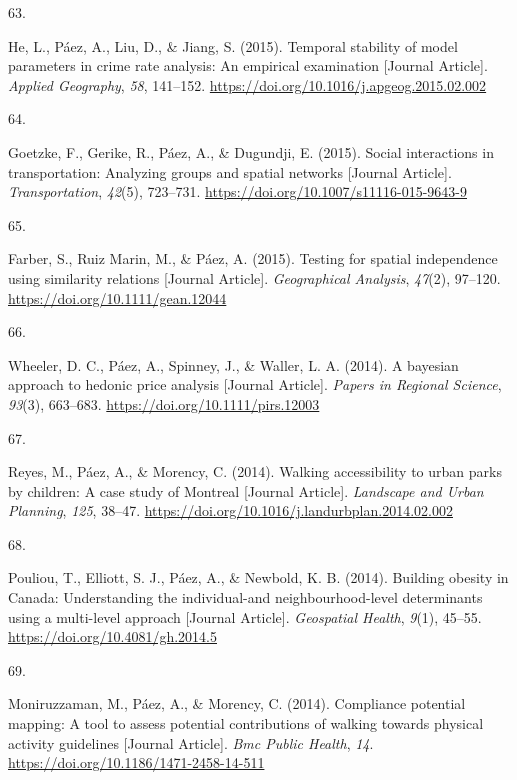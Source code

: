 \documentclass[11pt,a4paper,]{awesome-cv}
\newlength{\cslhangindent}
\newlength{\csllabelwidth}
\newenvironment{CSLReferences}[2] %
 {\begin{list}{}{%
  \setlength{\itemindent}{0pt}
  \setlength{\leftmargin}{0pt}
  \setlength{\parsep}{0pt}
  \ifodd #1
   \setlength{\leftmargin}{\cslhangindent}
   \setlength{\itemindent}{-1\cslhangindent}
  \fi
  \setlength{\itemsep}{#2\baselineskip}}}
 {\end{list}}
\newcommand{\CSLLeftMargin}[1]{\parbox[t]{\csllabelwidth}{\strut#1\strut}}
\newcommand{\CSLRightInline}[1]{\parbox[t]{\linewidth - \csllabelwidth}{\strut#1\strut}}
\begin{document}
\begin{CSLReferences}{0}{0}
\CSLLeftMargin{63. }%
\CSLRightInline{He, L., Páez, A., Liu, D., \& Jiang, S. (2015). Temporal
stability of model parameters in crime rate analysis: An empirical
examination {[}Journal Article{]}. \emph{Applied Geography}, \emph{58},
141--152. \url{https://doi.org/10.1016/j.apgeog.2015.02.002}}

\CSLLeftMargin{64. }%
\CSLRightInline{Goetzke, F., Gerike, R., Páez, A., \& Dugundji, E.
(2015). Social interactions in transportation: Analyzing groups and
spatial networks {[}Journal Article{]}. \emph{Transportation},
\emph{42}(5), 723--731. \url{https://doi.org/10.1007/s11116-015-9643-9}}

\CSLLeftMargin{65. }%
\CSLRightInline{Farber, S., Ruiz Marin, M., \& Páez, A. (2015). Testing
for spatial independence using similarity relations {[}Journal
Article{]}. \emph{Geographical Analysis}, \emph{47}(2), 97--120.
\url{https://doi.org/10.1111/gean.12044}}

\CSLLeftMargin{66. }%
\CSLRightInline{Wheeler, D. C., Páez, A., Spinney, J., \& Waller, L. A.
(2014). A bayesian approach to hedonic price analysis {[}Journal
Article{]}. \emph{Papers in Regional Science}, \emph{93}(3), 663--683.
\url{https://doi.org/10.1111/pirs.12003}}

\CSLLeftMargin{67. }%
\CSLRightInline{Reyes, M., Páez, A., \& Morency, C. (2014). Walking
accessibility to urban parks by children: A case study of Montreal
{[}Journal Article{]}. \emph{Landscape and Urban Planning}, \emph{125},
38--47. \url{https://doi.org/10.1016/j.landurbplan.2014.02.002}}

\CSLLeftMargin{68. }%
\CSLRightInline{Pouliou, T., Elliott, S. J., Páez, A., \& Newbold, K. B.
(2014). Building obesity in Canada: Understanding the individual-and
neighbourhood-level determinants using a multi-level approach {[}Journal
Article{]}. \emph{Geospatial Health}, \emph{9}(1), 45--55.
\url{https://doi.org/10.4081/gh.2014.5}}

\CSLLeftMargin{69. }%
\CSLRightInline{Moniruzzaman, M., Páez, A., \& Morency, C. (2014).
Compliance potential mapping: A tool to assess potential contributions
of walking towards physical activity guidelines {[}Journal Article{]}.
\emph{Bmc Public Health}, \emph{14}.
\url{https://doi.org/10.1186/1471-2458-14-511}}


\end{CSLReferences}
\end{document}
